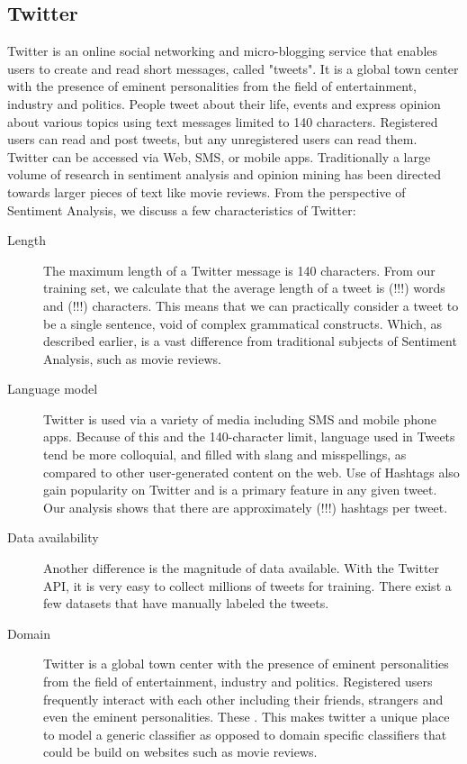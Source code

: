 \subsection{Twitter}
Twitter is an online social networking and micro-blogging service that enables users
	to create and read short messages, called "tweets".
It is a global town center with the presence of eminent personalities from
	the field of entertainment, industry and politics.
People tweet about their life, events and express opinion about various topics
	using text messages limited to 140 characters.
Registered users can read and post tweets, but any unregistered users can read them.
Twitter can be accessed via Web, SMS, or mobile apps.
Traditionally a large volume of research in sentiment analysis and opinion mining
	has been directed towards larger pieces of text like movie reviews.
From the perspective of Sentiment Analysis, we discuss a few characteristics of Twitter:

\begin{description}
\item[Length]{
The maximum length of a Twitter message is 140 characters.
From our training set, we calculate that the average length of a tweet is
	(!!!) words and (!!!) characters.
This means that we can practically consider a tweet to be a single sentence,
	void of complex grammatical constructs.
Which, as described earlier, is a vast difference from traditional
	subjects of Sentiment Analysis, such as movie reviews.
}
\item[Language model]{
Twitter is used via a variety of media including SMS and mobile phone apps.
Because of this and the 140-character limit, language used in Tweets tend be more colloquial,
	and filled with slang and misspellings, as compared to other user-generated content on the web.
Use of Hashtags also gain popularity on Twitter and is a primary feature in any given tweet.
Our analysis shows that there are approximately (!!!) hashtags per tweet.
}
\item[Data availability]{
Another difference is the magnitude of data available.
With the Twitter API, it is very easy to collect millions of tweets for training.
There exist a few datasets that have manually labeled the tweets.
}
\item[Domain]{
Twitter is a global town center with the presence of eminent personalities from
	the field of entertainment, industry and politics.
Registered users frequently interact with each other including their friends,
	strangers and even the eminent personalities.
These .
This makes twitter a unique place to model a generic classifier as opposed to
	domain specific classifiers that could be build on websites such as movie reviews.
}
\end{description}
